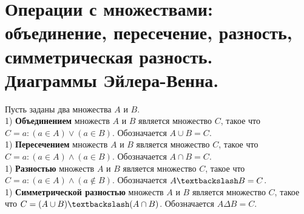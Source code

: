 \documentclass[a4paper,11pt]{report}
\begin{document}
\section{Операции с множествами: объединение, пересечение, разность, 
симметрическая разность. Диаграммы Эйлера-Венна.}
Пусть заданы два множества $A$ и $B$.\\
1) \textbf{Объединением} множеств $A$ и $B$ является множество $C$, такое что
$C = {a : (a \in A) \vee (a \in B)}$. Обозначается $A \cup B = C$.\\
1) \textbf{Пересечением} множеств $A$ и $B$ является множество $C$, такое что
$C = {a : (a \in A) \wedge (a \in B)}$. Обозначается $A \cap B = C$.\\
1) \textbf{Разностью} множеств $A$ и $B$ является множество $C$, такое что
$C = {a : (a \in A) \wedge (a \notin B)}$. Обозначается $A \textbackslash B = C$.\\
1) \textbf{Симметрической разностью} множеств $A$ и $B$ является множество $C$, такое что
$C = (A \cup B)\textbackslash(A \cap B)$. Обозначается $A \Delta B = C$.\\
\end{document}
